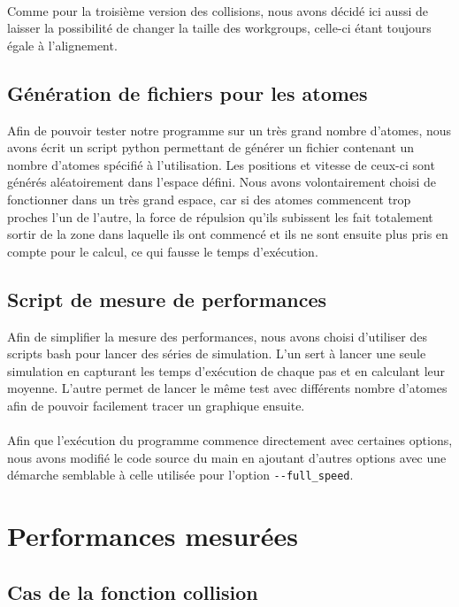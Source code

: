 \documentclass{article}
\begin{document}
\paragraph{}
Comme pour la troisième version des collisions, nous avons décidé ici aussi de
laisser la possibilité de changer la taille des workgroups, celle-ci étant
toujours égale à l'alignement.

\subsection{Génération de fichiers pour les atomes}
Afin de pouvoir tester notre programme sur un très grand nombre d'atomes, nous
avons écrit un script python permettant de générer un fichier contenant un
nombre d'atomes spécifié à l'utilisation. Les positions et vitesse de ceux-ci
sont générés aléatoirement dans l'espace défini. Nous avons volontairement
choisi de fonctionner dans un très grand espace, car si des atomes commencent
trop proches l'un de l'autre, la force de répulsion qu'ils subissent les fait
totalement sortir de la zone dans laquelle ils ont commencé et ils ne sont
ensuite plus pris en compte pour le calcul, ce qui fausse le temps d'exécution.

\subsection{Script de mesure de performances}
Afin de simplifier la mesure des performances, nous avons choisi d'utiliser des
scripts bash pour lancer des séries de simulation. L'un sert à lancer une seule
simulation en capturant les temps d'exécution de chaque pas et en calculant leur
moyenne. L'autre permet de lancer le même test avec différents nombre d'atomes
afin de pouvoir facilement tracer un graphique ensuite.
\paragraph{}
Afin que l'exécution du programme commence directement avec certaines options,
nous avons modifié le code source du main en ajoutant d'autres options avec une
démarche semblable à celle utilisée pour l'option \verb!--full_speed!.

\section{Performances mesurées}

\subsection{Cas de la fonction collision}
\end{document}

